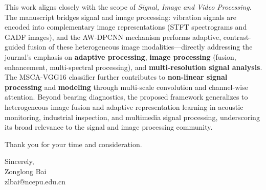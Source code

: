 \documentclass[a4paper,12pt]{article}
\begin{document}
This work aligns closely with the scope of \textit{Signal, Image and Video Processing}. The manuscript bridges signal and image processing: vibration signals are encoded into complementary image representations (STFT spectrograms and GADF images), and the AW-DPCNN mechanism performs adaptive, contrast-guided fusion of these heterogeneous image modalities---directly addressing the journal's emphasis on \textbf{adaptive processing}, \textbf{image processing} (fusion, enhancement, multi-spectral processing), and \textbf{multi-resolution signal analysis}. The MSCA-VGG16 classifier further contributes to \textbf{non-linear signal processing} and \textbf{modeling} through multi-scale convolution and channel-wise attention. Beyond bearing diagnostics, the proposed framework generalizes to heterogeneous image fusion and adaptive representation learning in acoustic monitoring, industrial inspection, and multimedia signal processing, underscoring its broad relevance to the signal and image processing community.

Thank you for your time and consideration.

\vspace{0.5em}

\noindent Sincerely,\\[0.5em]

\noindent Zonglong Bai\\
zlbai@ncepu.edu.cn
\end{document}
